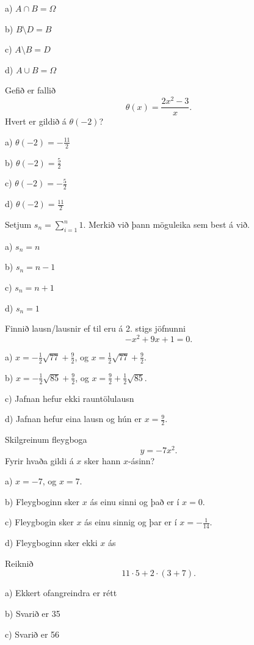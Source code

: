 a) $A\cap B=\Omega$

b) $B\setminus D=B $

c) $A\setminus B=D$

d) $A\cup B=\Omega$ %


\item Gefið er fallið $$\displaystyle\theta(x)=\frac{2x^2-3}{x}.$$ Hvert er gildið á $\theta(-2)$?

a) $\theta(-2)=-\frac{11}{2}$

b) $\theta(-2)=\frac{5}{2}$

c) $\theta(-2)=-\frac{5}{2}$ %

d) $\theta(-2)=\frac{11}{2}$


\item Setjum $s_n = \sum_{i=1}^n 1$. Merkið við þann möguleika sem best á við.
\newpage

a) $s_n = n$ %

b) $s_n = n-1$

c) $s_n = n+1$

d) $s_n = 1$


\item Finnið lausn/lausnir ef til eru á 2. stigs jöfnunni $$- x^{2} + 9 x + 1=0.$$

a) $x = - \frac{1}{2} \sqrt{77} + \frac{9}{2}$, og $x=\frac{1}{2} \sqrt{77} + \frac{9}{2}$.

b) $x = - \frac{1}{2} \sqrt{85} + \frac{9}{2}$, og $x=\frac{9}{2} + \frac{1}{2} \sqrt{85}$. %

c) Jafnan hefur ekki rauntölulausn

d) Jafnan hefur eina lausn og hún er $x=\frac{9}{2}$.


\item Skilgreinum fleygboga $$y=- 7 x^{2}.$$ Fyrir hvaða gildi á $x$ sker hann $x$-ásinn?

a) $x=-7$, og $x=7$.

b) Fleygboginn sker $x$ ás einu sinni og það er í $x=0$. %

c) Fleygbogin sker $x$ ás einu sinnig og þar er í $x=- \frac{1}{14}$.

d) Fleygboginn sker ekki $x$ ás


\item Reiknið
$$
11 \cdot 5+2 \cdot  \left ( 3+7 \right ) .
$$
\newpage

a) Ekkert ofangreindra er rétt

b) Svarið er 35

c) Svarið er 56

